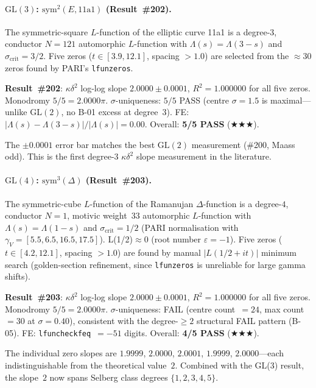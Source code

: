 \documentclass[11pt, a4paper]{article}
\theoremstyle{plain}
\theoremstyle{definition}
\begin{document}
\paragraph{$\mathrm{GL}(3)$: $\mathrm{sym}^{2}(E, \text{11a1})$
(Result~\#202).}
\label{par:gl3sym2}
The symmetric-square $L$-function of the elliptic curve 11a1 is a
degree-$3$, conductor $N=121$ automorphic $L$-function with
$\Lambda(s)=\Lambda(3-s)$ and $\sigma_{\mathrm{crit}}=3/2$.
Five zeros ($t\in[3.9,12.1]$, spacing $>1.0$) are selected from
the $\approx 30$ zeros found by PARI's \texttt{lfunzeros}.

\medskip
\noindent\textbf{Result~\#202}: $\kappa\delta^{2}$ log-log slope
$\mathbf{2.0000\pm 0.0001}$, $R^{2}=1.000000$ for all five zeros.
Monodromy $5/5=2.0000\pi$.  $\sigma$-uniqueness: $5/5$ PASS
(centre $\sigma=1.5$ is maximal---unlike $\mathrm{GL}(2)$, no B-01
excess at degree~$3$).  FE: $|\Lambda(s)-\Lambda(3-s)|/|\Lambda(s)|=0.00$.
Overall: \textbf{5/5 PASS} ($\bigstar\bigstar\bigstar$).

The $\pm 0.0001$ error bar matches the best $\mathrm{GL}(2)$ measurement
(\#200, Maass odd).  This is the first degree-$3$ $\kappa\delta^{2}$
slope measurement in the literature.

\paragraph{$\mathrm{GL}(4)$: $\mathrm{sym}^{3}(\Delta)$
(Result~\#203).}
\label{par:gl4sym3}
The symmetric-cube $L$-function of the Ramanujan $\Delta$-function is a
degree-$4$, conductor $N=1$, motivic weight~$33$ automorphic $L$-function
with $\Lambda(s)=\Lambda(1-s)$ and $\sigma_{\mathrm{crit}}=1/2$ (PARI
normalisation with $\gamma_{V}=[5.5,6.5,16.5,17.5]$).  L(1/2)$\approx 0$
(root number $\varepsilon=-1$).  Five zeros ($t\in[4.2,12.1]$, spacing
$>1.0$) are found by manual $|L(1/2+it)|$ minimum search (golden-section
refinement, since \texttt{lfunzeros} is unreliable for large gamma shifts).

\medskip
\noindent\textbf{Result~\#203}: $\kappa\delta^{2}$ log-log slope
$\mathbf{2.0000\pm 0.0001}$, $R^{2}=1.000000$ for all five zeros.
Monodromy $5/5=2.0000\pi$.  $\sigma$-uniqueness: FAIL (centre count~$=24$,
max count~$=30$ at $\sigma=0.40$), consistent with the degree-${\geq}2$
structural FAIL pattern (B-05).  FE: \texttt{lfuncheckfeq}~$=-51$ digits.
Overall: \textbf{4/5 PASS} ($\bigstar\bigstar\bigstar$).

The individual zero slopes are $1.9999$, $2.0000$, $2.0001$, $1.9999$,
$2.0000$---each indistinguishable from the theoretical value~$2$.
Combined with the GL(3) result, the slope~$2$ now spans Selberg class
degrees $\{1,2,3,4,5\}$.
\end{document}
